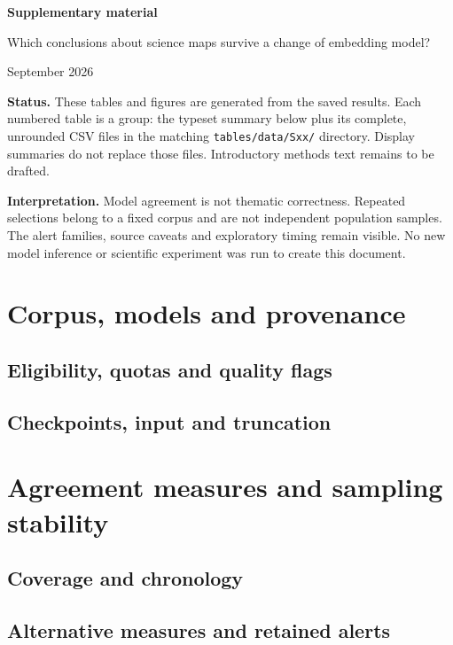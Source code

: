 \documentclass[12pt]{article}
\begin{document}
\begin{center}
{\LARGE\bfseries Supplementary material\par}
\medskip
{\large Which conclusions about science maps survive a change of embedding model?\par}
 September 2026
\end{center}
\textbf{Status.} These tables and figures are generated from the saved results. Each numbered table is a group: the typeset summary below plus its complete, unrounded CSV files in the matching \nolinkurl{tables/data/Sxx/} directory. Display summaries do not replace those files. Introductory methods text remains to be drafted.

\textbf{Interpretation.} Model agreement is not thematic correctness. Repeated selections belong to a fixed corpus and are not independent population samples. The alert families, source caveats and exploratory timing remain visible. No new model inference or scientific experiment was run to create this document.
\clearpage
{\small{}\tableofcontents}
\clearpage

\section{Corpus, models and provenance}
\subsection{Eligibility, quotas and quality flags}

\clearpage
\subsection{Checkpoints, input and truncation}

\clearpage

\section{Agreement measures and sampling stability}
\subsection{Coverage and chronology}

\subsection{Alternative measures and retained alerts}

\clearpage
\end{document}
